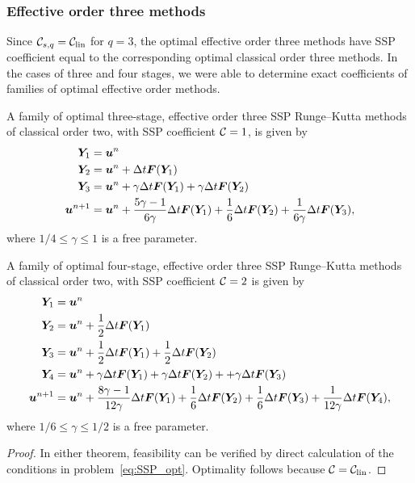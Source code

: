 \subsubsection{Effective order three methods}\label{subsubsec:3rd_ESSPRK}
Since $\mathcal{C}_{s,q}=\mathcal{C}_{\text{lin}}$ for $q=3$, the optimal effective order three methods
have SSP coefficient equal to the corresponding optimal classical order three methods.
In the cases of three and four stages, we were able to determine exact coefficients of
families of optimal effective order methods.
\begin{theorem}\label{thm:ESSPRK(3,3,2)}
	A family of optimal three-stage, effective order three SSP Runge--Kutta 
	methods of classical order two, with SSP coefficient $\mathcal{C}=1$, is given by
    \begin{displaymath}
    		\begin{split}
    			\bm{Y}_1 &= \bm{u}^n \\
    			\bm{Y}_2 &= \bm{u}^n + \Delta t\bm{F}(\bm{Y}_1) \\
    			\bm{Y}_3 &= \bm{u}^n + \gamma\Delta t\bm{F}(\bm{Y}_1) + \gamma\Delta t\bm{F}(\bm{Y}_2) \\
    			\bm{u}^{n+1} &= \bm{u}^n + \frac{5\gamma-1}{6\gamma}\Delta t\bm{F}(\bm{Y}_1) + \frac{1}{6}\Delta t\bm{F}(\bm{Y}_2) + \frac{1}{6\gamma}\Delta t\bm{F}(\bm{Y}_3),
        \end{split}
    \end{displaymath}
    where $1/4 \leq \gamma \leq 1$ is a free parameter.
\end{theorem}
\begin{theorem}\label{thm:ESSPRK(4,3,2)}
	A family of optimal four-stage, effective order three SSP Runge--Kutta 
	methods of classical order two, with SSP coefficient $\mathcal{C}=2$ is given by
    \begin{displaymath}
    		\begin{split}
    			\bm{Y}_1 &= \bm{u}^n \\
    			\bm{Y}_2 &= \bm{u}^n + \frac{1}{2}\Delta t\bm{F}(\bm{Y}_1) \\
    			\bm{Y}_3 &= \bm{u}^n + \frac{1}{2}\Delta t\bm{F}(\bm{Y}_1) + \frac{1}{2}\Delta t\bm{F}(\bm{Y}_2) \\
    			\bm{Y}_4 &= \bm{u}^n + \gamma\Delta t\bm{F}(\bm{Y}_1) + \gamma\Delta t\bm{F}(\bm{Y}_2) + + \gamma\Delta t\bm{F}(\bm{Y}_3) \\
    			\bm{u}^{n+1} &= \bm{u}^n + \frac{8\gamma-1}{12\gamma}\Delta t\bm{F}(\bm{Y}_1) + \frac{1}{6}\Delta t\bm{F}(\bm{Y}_2) + \frac{1}{6}\Delta t\bm{F}(\bm{Y}_3) + \frac{1}{12\gamma}\Delta t\bm{F}(\bm{Y}_4),
        \end{split}
    \end{displaymath}
    where $ 1/6 \leq \gamma \leq 1/2 $ is a free parameter.
\end{theorem}
\begin{proof}
	In either theorem, feasibility can be verified by direct calculation of the 
	conditions in problem~\eqref{eq:SSP_opt}. Optimality follows because 
	$\mathcal{C}=\mathcal{C}_{\text{lin}}$.
\end{proof}

